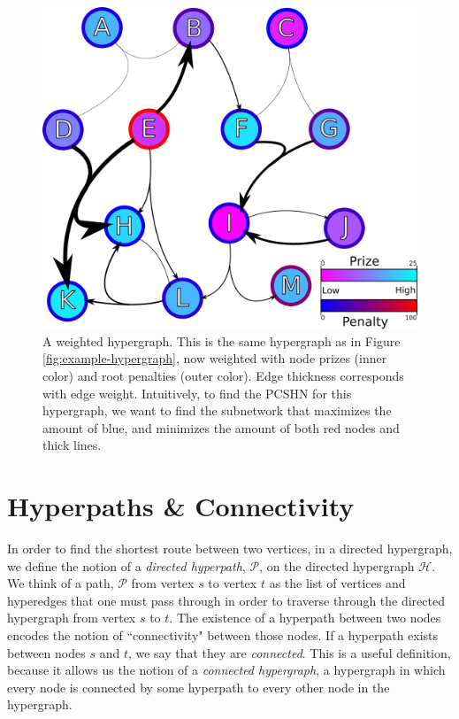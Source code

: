 \documentclass[12pt,twoside]{reedthesis}
\theoremstyle{definition}
\begin{document}
\begin{figure}[thbp]
  \begin{center}
    \includegraphics[width=\textwidth]{example-hypergraph-weighted}
  \caption[A weighted hypergraph.]{A weighted hypergraph. This is the same hypergraph as in Figure \ref{fig:example-hypergraph}, now weighted with node prizes (inner color) and root penalties (outer color). Edge thickness corresponds with edge weight. Intuitively, to find the PCSHN for this hypergraph, we want to find the subnetwork that maximizes the amount of blue, and minimizes the amount of both red nodes and thick lines.}
  \label{fig:example-hypergraph-weighted}
  \end{center}
\end{figure}

\section{Hyperpaths \& Connectivity}
In order to find the shortest route between two vertices, in a directed hypergraph, we define the notion of a \textit{directed hyperpath}, $\mathcal{P}$, on the directed hypergraph $\mathcal{H}$.  We think of a path, $\mathcal{P}$ from vertex $s$ to vertex $t$ as the list of vertices and hyperedges that one must pass through in order to traverse through the directed hypergraph from vertex $s$ to $t$. The existence of a hyperpath between two nodes encodes the notion of ``connectivity" between those nodes.  If a hyperpath exists between nodes $s$ and $t$, we say that they are \textit{connected}. This is a useful definition, because it allows us the notion of a \textit{connected hypergraph}, a hypergraph in which every node is connected by some hyperpath to every other node in the hypergraph.\par
\end{document}
